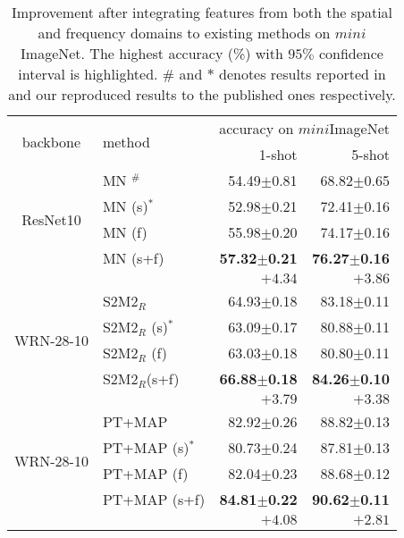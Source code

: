 \documentclass[10pt, conference, compsocconf]{IEEEtran}
\begin{document}
\begin{table}[t]
\centering
\caption{Improvement after integrating features from both the spatial and frequency domains to existing methods on $\textit{mini}$ImageNet. The highest accuracy (\%) with $95\%$ confidence interval is highlighted. ${\#}$ and ${*}$  denotes results reported in  \cite{chen2019closer} and our reproduced results to the published ones respectively.}
\begin{tabular}{c|l|rr}
\toprule
\multirow{2}{*}{backbone} & \multirow{2}{*}{method} & \multicolumn{2}{c}{accuracy on $\textit{mini}$ImageNet} \\
& & 1-shot& 5-shot\\ \hline
\multirow{4}{*}{ResNet10}& MN \cite{vinyals2016matching}$^{\#}$ & 54.49$\pm$0.81 & 68.82$\pm$0.65 \\
 & MN (s)$^{*}$ &  52.98$\pm$0.21 & 72.41$\pm$0.16 \\
 & MN (f) &  55.98$\pm$0.20 & 74.17$\pm$0.16 \\ 
& MN (s+f) & \bf{57.32$\pm$0.21} & \bf{76.27$\pm$0.16} \\
&  & $\textit{+4.34}$&  $\textit{+3.86}$ \\ \hline

\multirow{4}{*}{WRN-28-10}  & S2M2$_{R} $\cite{mangla2020charting} &64.93$\pm$0.18 & 83.18$\pm$0.11 \\
& S2M2$_{R}$ (s)$^{*}$ &{}{63.09$\pm$0.17}  &{}{80.88$\pm$0.11} \\
& S2M2$_{R}$ (f)  & 63.03$\pm$0.18  &  80.80$\pm$0.11\\
& S2M2$_{R}$(s+f)  & {}{\bf{66.88$\pm$0.18}}  & {}{\bf{84.26$\pm$0.10}}  \\
&  & {}{$\textit{+3.79}$}&  {}{$\textit{+3.38}$} \\ \hline
\multirow{4}{*}{WRN-28-10} & PT+MAP \cite{hu2020leveraging}  & 82.92$\pm$0.26 & 88.82$\pm$0.13 \\
& PT+MAP (s)$^{*}$ &{}{80.73$\pm$0.24}&{}{87.81$\pm$0.13}  \\
& PT+MAP (f) &82.04$\pm$0.23 & 88.68$\pm$0.12  \\
& PT+MAP (s+f) &{}{\bf{84.81$\pm$0.22}} & {}{\bf{90.62$\pm$0.11}} \\
&  & {}{$\textit{+4.08}$}&  {}{$\textit{+2.81}$} \\ 
\bottomrule
\end{tabular}
\label{table5}
\end{table}
\end{document}
